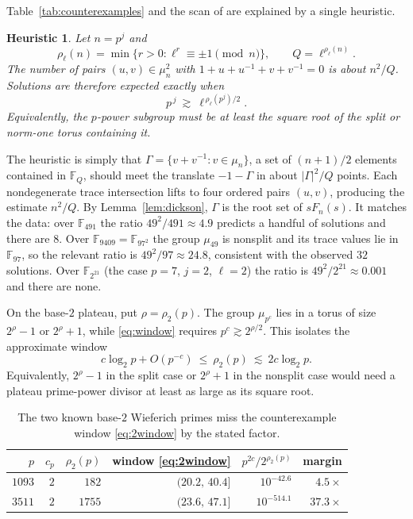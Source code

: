 \documentclass[a4paper]{article}
\newtheorem{heuristic}[theorem]{Heuristic}
\newcommand{\F}{\mathbb{F}}
\newcommand{\abs}[1]{\left|#1\right|}
\begin{document}
Table~\ref{tab:counterexamples} and the scan of
 are explained by a single
heuristic.

\begin{heuristic}\label{heur}
	Let $n=p^j$ and
	\[
		\rho_\ell(n)=\min\{r>0:\ell^r\equiv\pm1\pmod n\},
		\qquad Q=\ell^{\rho_\ell(n)}.
	\]
	The number of pairs $(u,v)\in\mu_n^2$ with
	$1+u+u^{-1}+v+v^{-1}=0$ is about $n^{2}/Q$.
	Solutions are therefore expected exactly when
	\begin{equation}\label{eq:window}
		p^{\,j}\ \gtrsim\ \ell^{\,\rho_\ell(p^j)/2}.
	\end{equation}
	Equivalently, the $p$-power subgroup must be at least the square root
	of the split or norm-one torus containing it.
\end{heuristic}

The heuristic is simply that $\Gamma=\{v+v^{-1}:v\in\mu_n\}$, a set of
$(n+1)/2$ elements contained in $\F_Q$, should meet the translate
$-1-\Gamma$ in about $\abs{\Gamma}^2/Q$ points.  Each nondegenerate trace
intersection lifts to four ordered pairs $(u,v)$, producing the estimate
$n^2/Q$.  By Lemma~\ref{lem:dickson}, $\Gamma$ is the root set of
$sF_n(s)$.
It matches the data: over $\F_{491}$ the ratio $49^{2}/491\approx4.9$
predicts a handful of solutions and there are $8$.
Over $\F_{9409}=\F_{97^2}$ the group $\mu_{49}$ is nonsplit and its trace
values lie in $\F_{97}$, so the relevant ratio is
$49^2/97\approx24.8$, consistent with the observed $32$ solutions.
Over $\F_{2^{21}}$
(the case $p=7$, $j=2$, $\ell=2$) the ratio is $49^{2}/2^{21}\approx0.001$
and there are none.

On the base-$2$ plateau, put $\rho=\rho_2(p)$.
The group $\mu_{p^c}$ lies in a torus of size $2^\rho-1$ or
$2^\rho+1$, while \eqref{eq:window} requires $p^c\gtrsim2^{\rho/2}$.
This isolates the approximate window
\begin{equation}\label{eq:2window}
	c\log_2 p+O(p^{-c})\ \leq\ \rho_2(p)\
	\lesssim\ 2c\log_2 p .
\end{equation}
Equivalently, $2^\rho-1$ in the split case or $2^\rho+1$ in the nonsplit
case would need a plateau prime-power divisor at least as large as its
square root.

\begin{table}[h]
	\centering
	\begin{tabular}{rrrrrr}
		\toprule
		$p$ & $c_p$ & $\rho_2(p)$ & window \eqref{eq:2window} & $p^{2c}/2^{\rho_2(p)}$ & margin\\
		\midrule
		$1093$ & $2$ & $182$  & $(20.2,\,40.4]$ & $10^{-42.6}$  & $4.5\times$\\
		$3511$ & $2$ & $1755$ & $(23.6,\,47.1]$ & $10^{-514.1}$ & $37.3\times$\\
		\bottomrule
	\end{tabular}
	\caption{The two known base-$2$ Wieferich primes miss the counterexample
	window \eqref{eq:2window} by the stated factor.}
	\label{tab:window}
\end{table}
\end{document}
